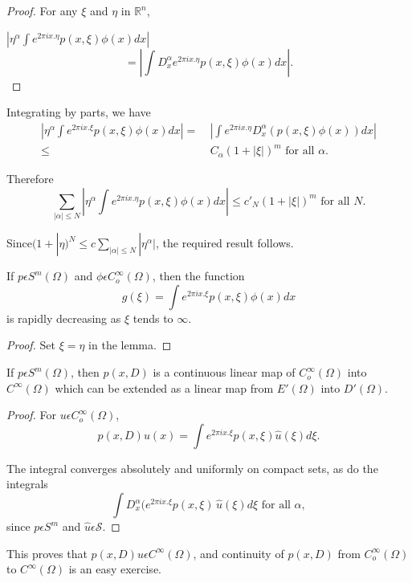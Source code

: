 \begin{proof}
  For any $\xi$ and $\eta$ in $\mathbb{R}^n$,

  $| \eta^\alpha \int e^{2 \pi i x.\eta}p(x,\xi) \phi (x) dx |$
  $$
  = | \int D^\alpha_x e^{2 \pi i x.\eta}p(x,\xi) \phi (x) dx |.
  $$
\end{proof}

Integrating by parts, we have
\begin{align*}
| \eta^\alpha \int e^{2 \pi i x.\xi}p(x,\xi) \phi (x) dx |
  = &~ | \int e^{2 \pi i x.\eta} D^\alpha_x (p(x,\xi) \phi (x)) dx |\\
\le &~ C_\alpha (1+|\xi|)^m \text{ for all } \alpha.
\end{align*}

Therefore
$$
\sum_{| \alpha| \le N}| \eta^\alpha \int e^{2 \pi i
  x.\eta}p(x,\xi)\phi(x)dx|\le c'_N(1+|\xi|)^m \text{ for all } N. 
$$

Since\pageoriginale $(1+| \eta)^N \le c \sum\limits_{| \alpha| \le N}| \eta^\alpha
|$, the required result follows. 

\setcounter{coro}{5}
\begin{coro} \label{chap4:sec1:coro4.6}
If $p \epsilon S^m (\Omega)$ and $\phi \epsilon C^\infty_o
  (\Omega)$, then the function 
$$
g(\xi)= \int e^{2 \pi ix. \xi} p(x,\xi)\phi (x)dx
$$
is rapidly decreasing as $\xi$ tends to $\infty$.
\end{coro}

\begin{proof}
  Set $\xi = \eta$ in the lemma.
\end{proof}

\setcounter{thm}{6}
\begin{thm} \label{chap4:sec1:thm4.7}
  If $p \epsilon S^m(\Omega)$, then $p(x,D)$ is a continuous
    linear map of $C^\infty _o(\Omega)$ into $C^\infty (\Omega)$ which
    can be extended as a linear map from $E'(\Omega)$ into
    $D'(\Omega)$. 
\end{thm}

\begin{proof}
  For $u \epsilon C^\infty_o (\Omega)$,
  $$
  p(x,D)u(x)= \int e^{2 \pi ix.\xi} p(x,\xi)\hat{u}(\xi)d \xi.
  $$

  The integral converges absolutely and uniformly on compact sets, as do
  the integrals 
  $$
  \int D^\alpha_x(e^{2 \pi ix.\xi} p(x,\xi)\,\hat{u}(\xi)d \xi \text{ for
    all }\alpha, 
  $$
  since $p \epsilon S^m$ and $\hat{u} \epsilon \mathcal{S}$.
\end{proof}
  This proves that $p(x, D)u \epsilon C^\infty (\Omega)$, and
  continuity of $p(x, D)$ from $C^\infty_o (\Omega)$ to $C^\infty
  (\Omega)$ is an easy exercise.

